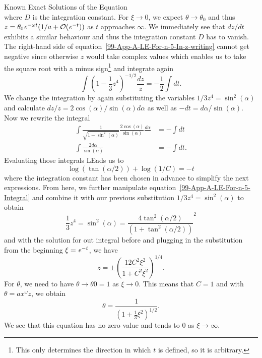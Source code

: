 \begin{appendix}
\begin{section}
\begin{subsection}{Known Exact Solutions of the \texorpdfstring{}{LE} Equation}
\begin{equation}
	\label{99-App-A-LE-For-n-5-In-z-writing}
\end{equation}
where $D$ is the integration constant. For $\xi\rightarrow0$, we expect $\theta\rightarrow\theta_0$ and thus $z=\theta_0\mathit{e}^{-\omega t}(1/a+\mathcal{O}(\mathit{e}^{-t}))$ as $t$ approaches $\infty$.
We immediately see that $dz/dt$ exhibits a similar behaviour and thus the integration constant $D$ has to vanish.\\
The right-hand side of equation~\ref{99-App-A-LE-For-n-5-In-z-writing} cannot get negative since otherwise $z$ would take complex values which enables us to take the square root with a minus sign\footnote{This only determines the direction in which $t$ is defined, so it is arbitrary.} and integrate again
\begin{equation}
	\int\left(1-\frac{1}{3}z^4\right)^{-1/2}\frac{dz}{z}=-\frac{1}{2}\int dt.
\end{equation}
We change the integration by again substituting the variables $1/3z^4=\sin^2(\alpha)$ and calculate $dz/z=2\cos(\alpha)/\sin(\alpha)d\alpha$ as well as $-dt=d\alpha/\sin(\alpha)$.
Now we rewrite the integral
\begin{align}
	\int\frac{1}{\sqrt{1-\sin^2(\alpha)}}\frac{2\cos(\alpha)}{\sin(\alpha)}\frac{d\alpha}{} &= -\int dt\\
	\int\frac{2d\alpha}{\sin(\alpha)} &= -\int dt.
\end{align}
Evaluating those integrals \ac{LE}ads us to
\begin{equation}
	\log(\tan(\alpha/2))+\log(1/C) = -t
	\label{99-App-A-LE-For-n-5-Integral}
\end{equation}
where the integration constant has been chosen in advance to simplify the next expressions.
From here, we further manipulate equation~\ref{99-App-A-LE-For-n-5-Integral} and combine it with our previous substitution $1/3z^4=\sin^2(\alpha)$ to obtain
\begin{equation}
	\frac{1}{3}z^4=\sin^2(\alpha)=\frac{4\tan^2(\alpha/2)}{\left(1+\tan^2(\alpha/2)\right)}^2
\end{equation}
and with the solution for out integral before and plugging in the substitution from the beginning $\xi=\mathit{e}^{-t}$, we have
\begin{equation}
	z=\pm\left(\frac{12C^2\xi^2}{1+C^2\xi^2}\right)^{1/4}.
\end{equation}
For $\theta$, we need to have $\theta\rightarrow\theta0=1$ as $\xi\rightarrow0$.
This means that $C=1$ and with $\theta=ax^\omega z$, we obtain
\begin{equation}
	\theta = \frac{1}{\left(1+\frac{1}{3}\xi^2\right)^{1/2}}.
\end{equation}
We see that this equation has no zero value and tends to $0$ as $\xi\rightarrow\infty$.
\end{subsection}
%
%
%

\end{section}
\end{appendix}
